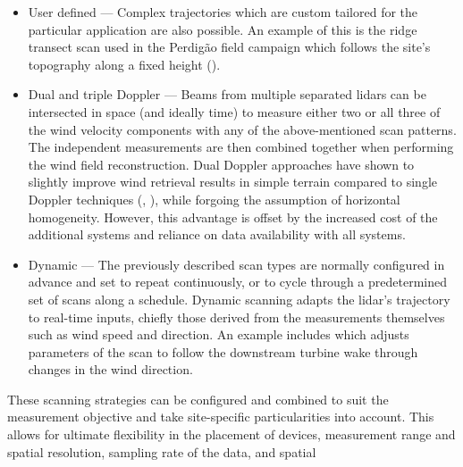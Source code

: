 \begin{itemize}
\item User defined --- Complex trajectories which are custom tailored for the particular application are also possible. An example of this is the ridge transect scan used in the Perdig\~ao field campaign which follows the site's topography along a fixed height (\cite{robert_menke_perdigao_2017}).

\item Dual and triple Doppler --- Beams from multiple separated lidars can be intersected in space (and ideally time) to measure either two or all three of the wind velocity components with any of the above-mentioned scan patterns. The independent measurements are then combined together when performing the wind field reconstruction. Dual Doppler approaches have shown to slightly improve wind retrieval results in simple terrain compared to single Doppler techniques (\cite{simon_comparison_2016}, \cite{floors_report_2016}), while forgoing the assumption of horizontal homogeneity. However, this advantage is offset by the increased cost of the additional systems and reliance on data availability with all systems.

\item Dynamic --- The previously described scan types are normally configured in advance and set to repeat continuously, or to cycle through a predetermined set of scans along a schedule. Dynamic scanning adapts the lidar's trajectory to real-time inputs, chiefly those derived from the measurements themselves such as wind speed and direction. An example includes \cite{wildmann_wind_2018} which adjusts parameters of the scan to follow the downstream turbine wake through changes in the wind direction.

\end{itemize}

These scanning strategies can be configured and combined to suit the measurement objective and take site-specific particularities into account. This allows for ultimate flexibility in the placement of devices, measurement range and spatial resolution, sampling rate of the data, and spatial 

\clearpage